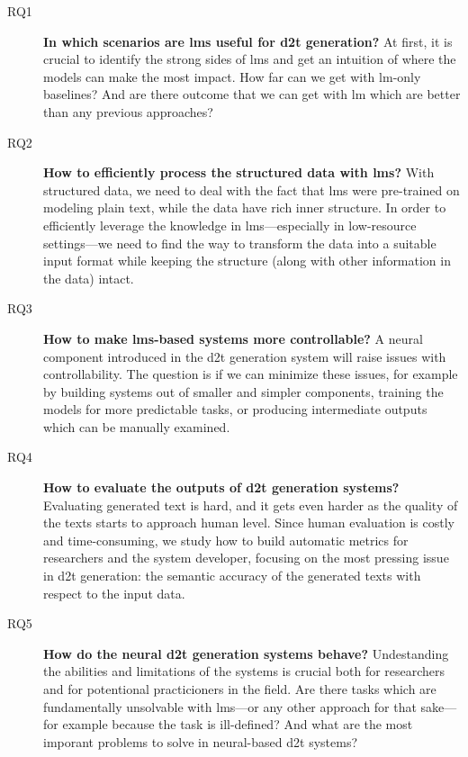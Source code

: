 \begin{description}
    \item[RQ1] \textbf{In which scenarios are \acp{lm} useful for \ac{d2t} generation?} At first, it is crucial to identify the strong sides of \acp{lm} and get an intuition of where the models can make the most impact. How far can we get with \ac{lm}-only baselines? And are there outcome that we can get with \ac{lm} which are better than any previous approaches?
    \item[RQ2] \textbf{How to efficiently process the structured data with \acp{lm}?} With structured data, we need to deal with the fact that \acp{lm} were pre-trained on modeling plain text, while the data have rich inner structure. In order to efficiently leverage the knowledge in \acp{lm}---especially in low-resource settings---we need to find the way to transform the data into a suitable input format while keeping the structure (along with other information in the data) intact.
    \item[RQ3] \textbf{How to make \acp{lm}-based systems more controllable?} A neural component introduced in the \ac{d2t} generation system will raise issues with controllability. The question is if we can minimize these issues, for example by building systems out of smaller and simpler components, training the models for more predictable tasks, or producing intermediate outputs which can be manually examined.
    \item[RQ4] \textbf{How to evaluate the outputs of \ac{d2t} generation systems?} Evaluating generated text is hard, and it gets even harder as the quality of the texts starts to approach human level. Since human evaluation is costly and time-consuming, we study how to build automatic metrics for researchers and the system developer, focusing on the most pressing issue in \ac{d2t} generation: the semantic accuracy of the generated texts with respect to the input data.
    \item[RQ5] \textbf{How do the neural \ac{d2t} generation systems behave?} Undestanding the abilities and limitations of the systems is crucial both for researchers and for potentional practicioners in the field. Are there tasks which are fundamentally unsolvable with \acp{lm}---or any other approach for that sake---for example because the task is ill-defined? And what are the most imporant problems to solve in neural-based \ac{d2t} systems?
\end{description}



